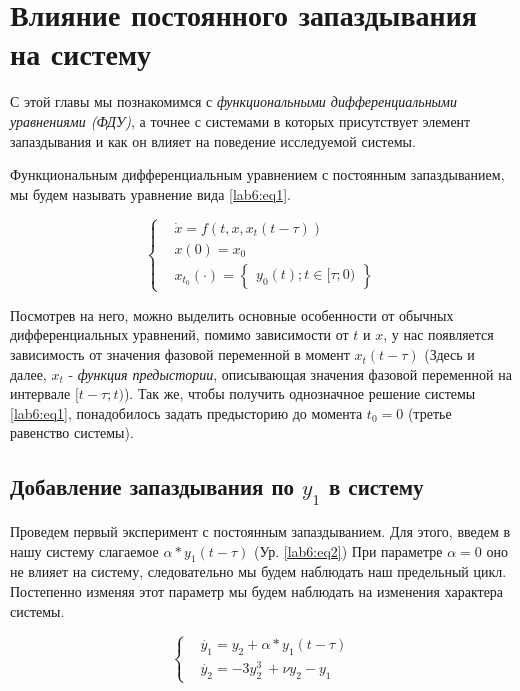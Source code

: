 \chapter{Влияние постоянного запаздывания на систему}

С этой главы мы познакомимся с \textit{функциональными дифференциальными
уравнениями (ФДУ)}, а точнее с системами в которых присутствует элемент
запаздывания и как он влияет на поведение исследуемой системы.

\begin{definition}
    Функциональным дифференциальным уравнением с постоянным запаздыванием,
    мы будем называть уравнение вида \ref{lab6:eq1}.
\end{definition}

\begin{equation}\label{lab6:eq1}
    \begin{cases}
        &\dot{x} = f(t, x, x_t(t - \tau)) \\
        &x(0) = x_0 \\
        &x_{t_0}(\cdot) = \begin{Bmatrix}y_0(t); t \in [\tau;0)\end{Bmatrix}
    \end{cases}
\end{equation}

Посмотрев на него, можно выделить основные особенности от обычных дифференциальных
уравнений, помимо зависимости от $t$ и $x$, у нас появляется зависимость от
значения фазовой переменной в момент $x_t(t-\tau)$ (Здесь и далее, $x_t$ - \textit{функция
предыстории}, описывающая значения фазовой переменной на интервале $[t-\tau;t)$).
Так же, чтобы получить однозначное решение системы \ref{lab6:eq1}, понадобилось
задать предысторию до момента $t_0 = 0$ (третье равенство системы).

\section{Добавление запаздывания по $y_1$ в систему}\label{lab6:y1}

Проведем первый эксперимент с постоянным запаздыванием.
Для этого, введем в нашу систему слагаемое $\alpha * y_1(t-\tau)$ (Ур. \ref{lab6:eq2})
При параметре $\alpha = 0$ оно не влияет на систему, следовательно мы будем
наблюдать наш предельный цикл. Постепенно изменяя этот параметр мы будем наблюдать
на изменения характера системы.

\begin{equation}\label{lab6:eq2}
\begin{cases}
    &\dot{y_1} = y_2 + \alpha * y_1(t-\tau)\\
    &\dot{y_2} = -3y_2^3\ + \nu y_2 - y_1
\end{cases}
\end{equation}

